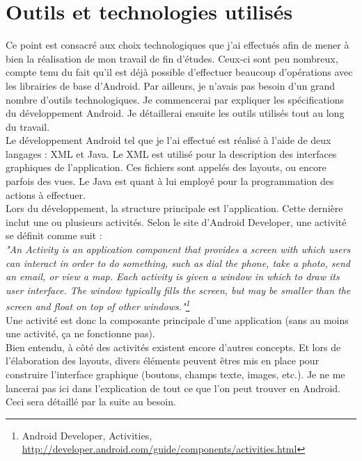 \section{Outils et technologies utilisés}
Ce point est consacré aux choix technologiques que j'ai effectués afin de mener à bien la réalisation de mon travail de fin d'études. Ceux-ci sont peu nombreux, compte tenu du fait qu'il est déjà possible d'effectuer beaucoup d'opérations avec les librairies de base d'Android. Par ailleurs, je n'avais pas besoin d'un grand nombre d'outils technologiques. Je commencerai par expliquer les spécifications du développement Android. Je détaillerai ensuite les outils utilisés tout au long du travail.\\

Le développement Android tel que je l'ai effectué est réalisé à l'aide de deux langages : XML et Java. Le XML est utilisé pour la description des interfaces graphiques de l'application. Ces fichiers sont appelés des layouts, ou encore parfois des vues. Le Java est quant à lui employé pour la programmation des actions à effectuer.\\

Lors du développement, la structure principale est l'application. Cette dernière inclut une ou plusieurs activités. Selon le site d'Android Developer, une activité se définit comme suit :\\
\textit{"An Activity is an application component that provides a screen with which users can interact in order to do something, such as dial the phone, take a photo, send an email, or view a map. Each activity is given a window in which to draw its user interface. The window typically fills the screen, but may be smaller than the screen and float on top of other windows."\footnote{Android Developer, Activities, \url{http://developer.android.com/guide/components/activities.html}}}\\
Une activité est donc la composante principale d'une application (sans au moins une activité, ça ne fonctionne pas).\\

Bien entendu, à côté des activités existent encore d'autres concepts. Et lors de l'élaboration des layouts, divers éléments peuvent êtres mis en place pour construire l'interface graphique (boutons, champs texte, images, etc.). Je ne me lancerai pas ici dans l'explication de tout ce que l'on peut trouver en Android. Ceci sera détaillé par la suite au besoin.\\

